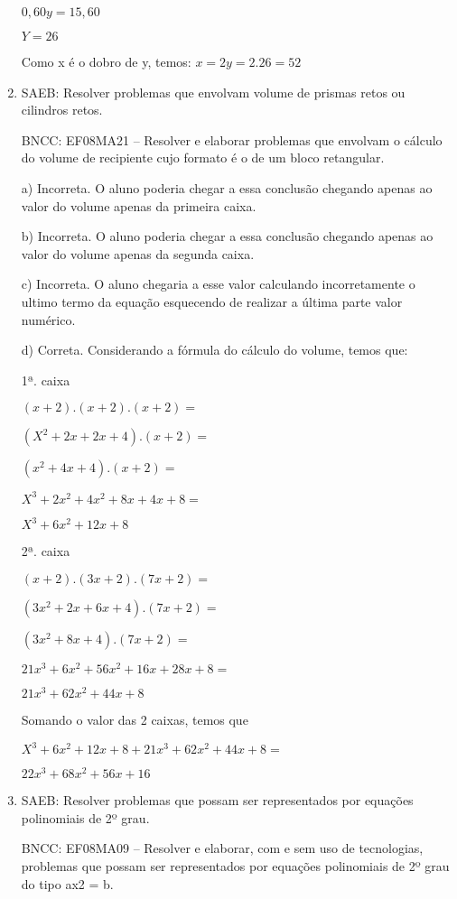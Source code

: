 \begin{enumerate}
$0,60y = 15,60$

$Y = 26$

Como x é o dobro de y, temos: $x = 2y = 2 . 26 = 52$

\item SAEB: Resolver problemas que envolvam volume de prismas retos ou
cilindros retos.

BNCC: EF08MA21 -- Resolver e elaborar problemas que envolvam o cálculo
do volume de recipiente cujo formato é o de um bloco retangular.

a) Incorreta. O aluno poderia chegar a essa conclusão chegando apenas ao
valor do volume apenas da primeira caixa.

b) Incorreta. O aluno poderia chegar a essa conclusão chegando apenas ao
valor do volume apenas da segunda caixa.

c) Incorreta. O aluno chegaria a esse valor calculando incorretamente o ultimo
termo da equação esquecendo de realizar a última parte valor numérico.

d) Correta. Considerando a fórmula do cálculo do volume, temos
que:

1ª. caixa

$(x+2) . (x+2) . (x+2) =$

$(X^2 + 2x + 2x + 4) . (x + 2) =$

$(x^2 + 4x + 4) . (x + 2) =$

$X^3 + 2x^2 + 4x^2 + 8x + 4x + 8 =$

$X^3 + 6x^2 + 12x + 8$

2ª. caixa

$(x + 2) . (3x + 2) . (7x + 2)=$

$(3x^2 +2x + 6x + 4) . (7x + 2)=$

$(3x^2 + 8x + 4 ) . (7x + 2)=$

$21x^3 + 6x^2 + 56x^2 + 16x + 28x + 8=$

$21x^3 + 62x^2 + 44x + 8$

Somando o valor das 2 caixas, temos que

$X^3 + 6x^2 + 12x +8 + 21x^3 + 62x^2 + 44x + 8 =$

$22x^3 + 68x^2 + 56x + 16$

\item SAEB: Resolver problemas que possam ser representados por equações
polinomiais de 2º grau.

BNCC: EF08MA09 -- Resolver e elaborar, com e sem uso de tecnologias,
problemas que possam ser representados por equações polinomiais de 2º
grau do tipo ax2 = b.


\end{enumerate}
